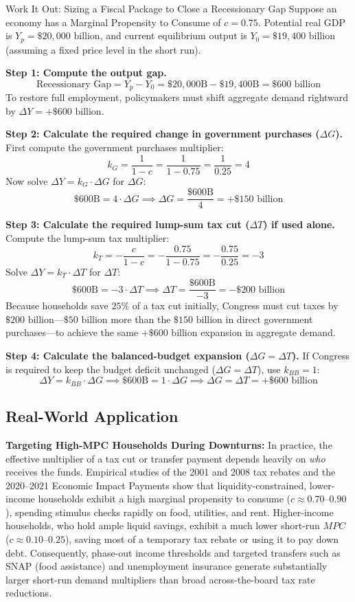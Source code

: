 \documentclass[11pt,letterpaper]{article}
\begin{document}
\begin{examplecase}{Work It Out: Sizing a Fiscal Package to Close a Recessionary Gap}
Suppose an economy has a Marginal Propensity to Consume of $c = 0.75$. Potential real GDP is $Y_p = \$20{,}000\text{ billion}$, and current equilibrium output is $Y_0 = \$19{,}400\text{ billion}$ (assuming a fixed price level in the short run).

\textbf{Step 1: Compute the output gap.}
\[
\text{Recessionary Gap} = Y_p - Y_0 = \$20{,}000\text{B} - \$19{,}400\text{B} = \$600\text{ billion}
\]
To restore full employment, policymakers must shift aggregate demand rightward by $\Delta Y = +\$600\text{ billion}$.

\textbf{Step 2: Calculate the required change in government purchases ($\Delta G$).}
First compute the government purchases multiplier:
\[
k_G = \frac{1}{1 - c} = \frac{1}{1 - 0.75} = \frac{1}{0.25} = 4
\]
Now solve $\Delta Y = k_G \cdot \Delta G$ for $\Delta G$:
\[
\$600\text{B} = 4 \cdot \Delta G \implies \Delta G = \frac{\$600\text{B}}{4} = +\$150\text{ billion}
\]

\textbf{Step 3: Calculate the required lump-sum tax cut ($\Delta T$) if used alone.}
Compute the lump-sum tax multiplier:
\[
k_T = -\frac{c}{1 - c} = -\frac{0.75}{1 - 0.75} = -\frac{0.75}{0.25} = -3
\]
Solve $\Delta Y = k_T \cdot \Delta T$ for $\Delta T$:
\[
\$600\text{B} = -3 \cdot \Delta T \implies \Delta T = \frac{\$600\text{B}}{-3} = -\$200\text{ billion}
\]
Because households save $25\%$ of a tax cut initially, Congress must cut taxes by $\$200\text{ billion}$---$\$50\text{ billion}$ more than the $\$150\text{ billion}$ in direct government purchases---to achieve the same $+\$600\text{ billion}$ expansion in aggregate demand.

\textbf{Step 4: Calculate the balanced-budget expansion ($\Delta G = \Delta T$).}
If Congress is required to keep the budget deficit unchanged ($\Delta G = \Delta T$), use $k_{BB} = 1$:
\[
\Delta Y = k_{BB} \cdot \Delta G \implies \$600\text{B} = 1 \cdot \Delta G \implies \Delta G = \Delta T = +\$600\text{ billion}
\]
\end{examplecase}

\subsection*{Real-World Application}
\textbf{Targeting High-MPC Households During Downturns:} In practice, the effective multiplier of a tax cut or transfer payment depends heavily on \emph{who} receives the funds. Empirical studies of the 2001 and 2008 tax rebates and the 2020--2021 Economic Impact Payments show that liquidity-constrained, lower-income households exhibit a high marginal propensity to consume ($c \approx 0.70\text{--}0.90$), spending stimulus checks rapidly on food, utilities, and rent. Higher-income households, who hold ample liquid savings, exhibit a much lower short-run $MPC$ ($c \approx 0.10\text{--}0.25$), saving most of a temporary tax rebate or using it to pay down debt. Consequently, phase-out income thresholds and targeted transfers such as SNAP (food assistance) and unemployment insurance generate substantially larger short-run demand multipliers than broad across-the-board tax rate reductions.
\end{document}
